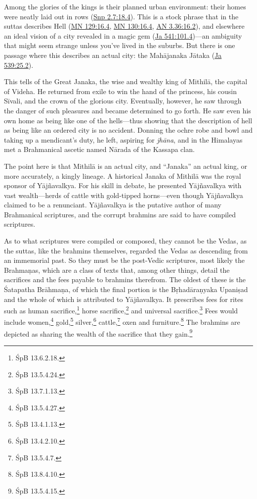 \documentclass[12pt,openany]{book}%
\begin{document}
Among the glories of the kings is their planned urban environment: their homes were neatly laid out in rows (\href{https://suttacentral.net/snp2.7/en/sujato\#18.4}{Snp 2.7:18.4}). This is a stock phrase that in the suttas describes Hell (\href{https://suttacentral.net/mn129/en/sujato\#16.4}{MN 129:16.4}, \href{https://suttacentral.net/mn130/en/sujato\#16.4}{MN 130:16.4}, \href{https://suttacentral.net/an3.36/en/sujato\#16.2}{AN 3.36:16.2}), and elsewhere an ideal vision of a city revealed in a magic gem (\href{https://suttacentral.net/ja541}{Ja 541:101.4})—an ambiguity that might seem strange unless you’ve lived in the suburbs. But there is one passage where this describes an actual city: the \textsanskrit{Mahājanaka} \textsanskrit{Jātaka} (\href{https://suttacentral.net/ja539}{Ja 539:25.2}).

This tells of the Great Janaka, the wise and wealthy king of \textsanskrit{Mithilā}, the capital of Videha. He returned from exile to win the hand of the princess, his cousin \textsanskrit{Sīvali}, and the crown of the glorious city. Eventually, however, he saw through the danger of such pleasures and became determined to go forth. He saw even his own home as being like one of the hells—thus showing that the description of hell as being like an ordered city is no accident. Donning the ochre robe and bowl and taking up a mendicant’s duty, he left, aspiring for \textit{\textsanskrit{jhāna}}, and in the Himalayas met a Brahmanical ascetic named \textsanskrit{Nārada} of the Kassapa clan.

The point here is that \textsanskrit{Mithilā} is an actual city, and “Janaka” an actual king, or more accurately, a kingly lineage. A historical Janaka of \textsanskrit{Mithilā} was the royal sponsor of \textsanskrit{Yājñavalkya}. For his skill in debate, he presented \textsanskrit{Yājñavalkya} with vast wealth—herds of cattle with gold-tipped horns—even though \textsanskrit{Yājñavalkya} claimed to be a renunciant. \textsanskrit{Yājñavalkya} is the putative author of many Brahmanical scriptures, and the corrupt brahmins are said to have compiled scriptures.

As to what scriptures were compiled or composed, they cannot be the Vedas, as the suttas, like the brahmins themselves, regarded the Vedas as descending from an immemorial past. So they must be the post-Vedic scriptures, most likely the \textsanskrit{Brahmaṇas}, which are a class of texts that, among other things, detail the sacrifices and the fees payable to brahmins therefrom. The oldest of these is the Śatapatha \textsanskrit{Brāhmaṇa}, of which the final portion is the \textsanskrit{Bṛhadāraṇyaka} \textsanskrit{Upaniṣad} and the whole of which is attributed to \textsanskrit{Yājñavalkya}. It prescribes fees for rites such as human sacrifice,\footnote{ŚpB 13.6.2.18. } horse sacrifice,\footnote{ŚpB 13.5.4.24. } and universal sacrifice.\footnote{ŚpB 13.7.1.13. } Fees would include women,\footnote{ŚpB 13.5.4.27. } gold,\footnote{ŚpB 13.4.1.13. } silver,\footnote{ŚpB 13.4.2.10. } cattle,\footnote{ŚpB 13.5.4.7. } oxen and furniture.\footnote{ŚpB 13.8.4.10. } The brahmins are depicted as sharing the wealth of the sacrifice that they gain.\footnote{ŚpB 13.5.4.15. }
\end{document}
